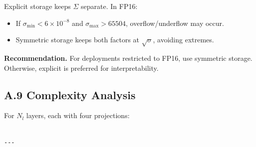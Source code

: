 Explicit storage keeps $\Sigma$ separate. In FP16:

\begin{itemize}
\item If $\sigma_\text{min} < 6 \times 10^{-8}$ and $\sigma_\text{max} > 65504$,
  overflow/underflow may occur.
\item Symmetric storage keeps both factors at $\sqrt{\sigma}$, avoiding
  extremes.

\end{itemize}
\textbf{Recommendation.} For deployments restricted to FP16, use symmetric 
storage. Otherwise, explicit is preferred for interpretability.

\subsection{A.9 Complexity Analysis}

For $N_l$ layers, each with four projections:

\begin{lstlisting}

---
\end{lstlisting}